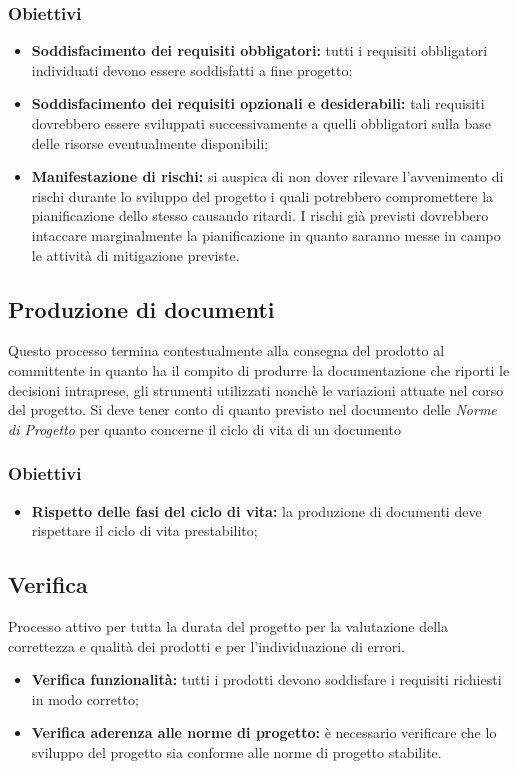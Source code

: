 \subsubsection{Obiettivi}
\begin{itemize}
    \item \textbf{Soddisfacimento dei requisiti obbligatori:} tutti i requisiti obbligatori individuati devono essere soddisfatti a fine progetto;
    \item \textbf{Soddisfacimento dei requisiti opzionali e desiderabili:} tali requisiti dovrebbero essere sviluppati successivamente a quelli obbligatori sulla base delle
          risorse eventualmente disponibili;
    \item \textbf{Manifestazione di rischi:} si auspica di non dover rilevare l'avvenimento di rischi durante lo sviluppo del progetto i quali potrebbero compromettere
          la pianificazione dello stesso causando ritardi. I rischi già previsti dovrebbero intaccare marginalmente la pianificazione in quanto saranno messe in campo le attività
          di mitigazione previste.
\end{itemize}

\subsection{Produzione di documenti}
Questo processo termina contestualmente alla consegna del prodotto al committente in quanto ha il compito di produrre la documentazione che riporti le decisioni intraprese,
gli strumenti utilizzati nonchè le variazioni attuate nel corso del progetto. Si deve tener conto di quanto previsto nel documento delle \textit{Norme di Progetto} per quanto
concerne il ciclo di vita di un documento

\subsubsection{Obiettivi}
\begin{itemize}
    \item \textbf{Rispetto delle fasi del ciclo di vita:} la produzione di documenti deve rispettare il ciclo di vita prestabilito;
\end{itemize}


\subsection{Verifica}
Processo attivo per tutta la durata del progetto per la valutazione della correttezza e qualità dei prodotti e per l'individuazione di errori.
\begin{itemize}
    \item  \textbf{Verifica funzionalità:} tutti i prodotti devono soddisfare i requisiti richiesti in modo corretto;
    \item \textbf{Verifica aderenza alle norme di progetto:} è necessario verificare che lo sviluppo del progetto sia conforme alle norme di progetto stabilite.
\end{itemize}

